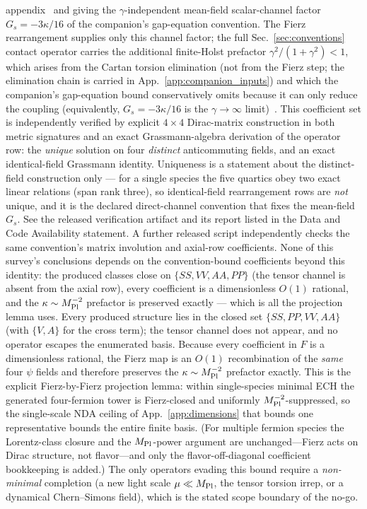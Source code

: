 \documentclass[aps,prd,twocolumn,superscriptaddress,showpacs,preprintnumbers,nofootinbib,longbibliography,floatfix]{revtex4-2}
\begin{document}
appendix~\cite{Golden2026P1a} and giving the $\gamma$-independent
mean-field scalar-channel factor $G_s=-3\kappa/16$ of the companion's
gap-equation convention. The Fierz rearrangement supplies only this
channel factor; the full Sec.~\ref{sec:conventions} contact operator
carries the additional finite-Holst prefactor $\gamma^2/(1+\gamma^2)<1$,
which arises from the Cartan torsion elimination (not from the Fierz
step; the elimination chain is carried in
App.~\ref{app:companion_inputs}) and which the companion's gap-equation bound conservatively omits
because it can only reduce the coupling (equivalently, $G_s=-3\kappa/16$
is the $\gamma\to\infty$ limit)~\cite{Golden2026P1a}. This
coefficient set is independently verified by explicit $4\times4$
Dirac-matrix construction in both metric signatures and an exact
Grassmann-algebra derivation of the operator row: the \emph{unique}
solution on four \emph{distinct} anticommuting fields, and an exact
identical-field Grassmann identity. Uniqueness is a statement about the
distinct-field construction only --- for a single species the five
quartics obey two exact linear relations (span rank three), so
identical-field rearrangement rows are \emph{not} unique, and it is the
declared direct-channel convention that fixes the mean-field $G_s$. See
the released verification artifact and its report listed in the Data and
Code Availability statement. A further released script independently
checks the same convention's matrix involution and axial-row coefficients.
None of this survey's conclusions depends on the convention-bound
coefficients beyond this identity: the produced classes close on
$\{SS,VV,AA,PP\}$ (the tensor channel is absent from the axial row), every
coefficient is a dimensionless $O(1)$ rational, and the
$\kappa\sim M_{\rm Pl}^{-2}$ prefactor is preserved exactly --- which is all
the projection lemma uses. Every produced structure lies in the closed set
$\{SS,PP,VV,AA\}$ (with $\{V,A\}$ for the cross term); the tensor channel does
not appear, and no operator escapes the enumerated basis. Because every
coefficient in $F$ is a dimensionless rational, the Fierz map is an $O(1)$
recombination of the \emph{same} four $\psi$ fields and therefore preserves the
$\kappa\sim M_{\rm Pl}^{-2}$ prefactor exactly. This is the explicit Fierz-by-Fierz
projection lemma: within single-species minimal ECH the generated four-fermion
tower is Fierz-closed and uniformly $M_{\rm Pl}^{-2}$-suppressed, so the
single-scale NDA ceiling of App.~\ref{app:dimensions} that bounds one
representative bounds the entire finite basis. (For multiple fermion species the
Lorentz-class closure and the $M_{\rm Pl}$-power argument are unchanged---Fierz
acts on Dirac structure, not flavor---and only the flavor-off-diagonal
coefficient bookkeeping is added.) The only operators evading this bound require
a \emph{non-minimal} completion (a new light scale $\mu\ll M_{\rm Pl}$,
the tensor torsion irrep, or a dynamical Chern--Simons field), which is the
stated scope boundary of the no-go.
\end{document}
